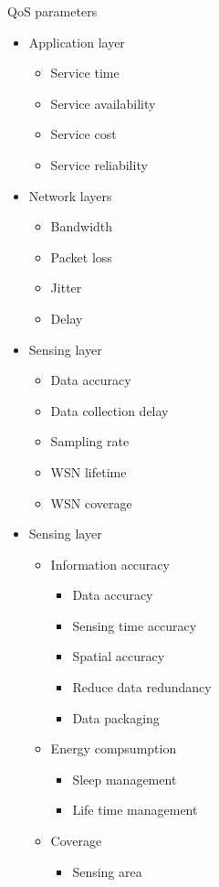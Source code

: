 QoS parameters \cite{meshinchi_qosaware_2018} \cite{chowdhury_survey_2018}
\begin{itemize}
	\item Application layer
	\begin{itemize}
		\item Service time
		\item Service availability
		\item Service cost
		\item Service reliability
	\end{itemize}
	\item Network layers
	\begin{itemize}
		\item Bandwidth
		\item Packet loss
		\item Jitter
		\item Delay
	\end{itemize}
	\item Sensing layer
	\begin{itemize}
		\item Data accuracy
		\item Data collection delay
		\item Sampling rate
		\item WSN lifetime
		\item WSN coverage
	\end{itemize}
	\item Sensing layer
	\begin{itemize}
		\item Information accuracy
		\begin{itemize}
			\item Data accuracy
			\item Sensing time accuracy
			\item Spatial accuracy
			\item Reduce data redundancy
			\item Data packaging
		\end{itemize}
		\item Energy compsumption
		\begin{itemize}
			\item Sleep management
			\item Life time management
		\end{itemize}
		\item Coverage
		\begin{itemize}
			\item Sensing area
		\end{itemize}
	\end{itemize}
\end{itemize}

